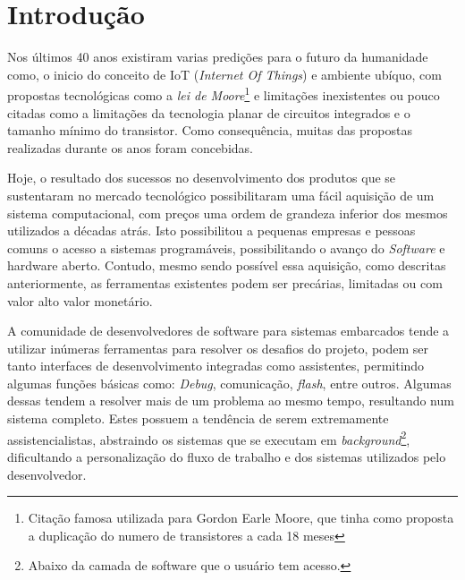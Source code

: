\chapter{Introdução}
Nos últimos 40 anos existiram varias predições para o futuro da humanidade como, o inicio do conceito de IoT\cite{gates1995estrada} (\textit{Internet Of Things}) e ambiente ubíquo, com propostas tecnológicas como a \textit{lei de Moore}\footnote{Citação famosa utilizada para Gordon Earle Moore, que tinha como proposta a duplicação do numero de transistores a cada 18 meses} e limitações inexistentes ou pouco citadas como a limitações da tecnologia planar de circuitos integrados e o tamanho mínimo do transistor. Como consequência, muitas das propostas realizadas durante os anos foram concebidas. 

\iffalse
Muitas das propostas que continuam ativas são extremamente dependentes do desenvolvimento da eletrônica para a sua concepção, encontrando desafios não só para a confecção destes, como também sua utilização pelos desenvolvedores.
\fi

Hoje, o resultado dos sucessos no desenvolvimento dos produtos que se sustentaram no mercado tecnológico possibilitaram uma fácil aquisição de um sistema computacional, com preços uma ordem de grandeza inferior dos mesmos utilizados a décadas atrás. Isto possibilitou a pequenas empresas e pessoas comuns o acesso a sistemas programáveis, possibilitando o avanço do \textit{Software} e hardware aberto. Contudo, mesmo sendo possível essa aquisição, como descritas anteriormente, as ferramentas existentes podem ser precárias, limitadas ou com valor alto valor monetário.

A comunidade de desenvolvedores de software para sistemas embarcados tende a utilizar inúmeras ferramentas para resolver os desafios do projeto, podem ser tanto interfaces de desenvolvimento integradas como assistentes, permitindo algumas funções básicas como: \textit{Debug}, comunicação, \textit{flash}, entre outros. Algumas dessas tendem a resolver mais de um problema ao mesmo tempo, resultando num sistema completo. Estes possuem a tendência de serem extremamente assistencialistas, abstraindo os sistemas que se executam em \textit{background}\footnote{Abaixo da camada de software que o usuário tem acesso.}, dificultando a personalização do fluxo de trabalho e dos sistemas utilizados pelo desenvolvedor.


\iffalse
O intuito deste trabalho é a realização de um sistema para possibilitar aos desenvolvedores a programação de sistemas embarcados, sem a necessidade de utilizar sistemas assistencialistas que possam limitar a evolução do trabalho ou a utilização do produto final concebido.
\fi

